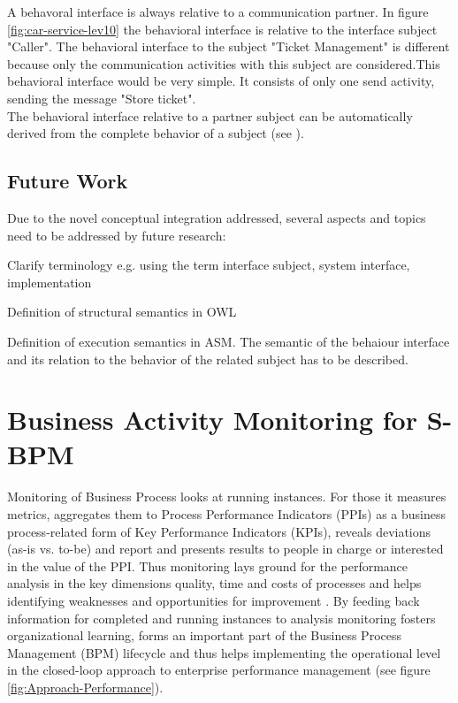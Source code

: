 A behavoral interface is always relative to a communication partner. In figure \ref{fig:car-service-lev10} the behavioral interface is relative to the interface subject "Caller". The behavioral interface to the subject "Ticket Management" is different because only the communication activities with this subject are considered.This behavioral interface would be very simple. It consists of only one send activity, sending the message "Store ticket".\\
The behavioral interface relative to a partner subject can be automatically derived from the complete behavior of a subject
(see \cite{article:jCPEX}).

\subsection{Future Work}

Due to the novel conceptual integration addressed, several aspects and topics need to be addressed by future research:
\begin{list}{-}{spacing}
	\item Clarify terminology e.g. using the term interface subject, system interface, implementation
	\item Definition of structural semantics in OWL
	\item Definition of execution semantics in ASM. The semantic of the behaiour interface and its relation to the behavior of the related subject has to be described.
\end{list}


\section{Business Activity Monitoring for S-BPM}\label{sec:BAMinSubjectOrientation}

Monitoring of Business Process looks at running instances. For those it measures metrics, aggregates them to Process Performance Indicators (PPIs) as a business process-related form of Key Performance Indicators (KPIs), reveals deviations (as-is vs. to-be) and report and presents results to people in charge or interested in the value of the PPI. Thus monitoring lays ground for the performance analysis in the key dimensions quality, time and costs of processes and helps identifying weaknesses and opportunities for improvement \cite{book:UntPerform}.
By feeding back information for completed and running instances to analysis monitoring fosters organizational learning, forms an important part of the Business Process Management (BPM) lifecycle \cite{article:SUbjetorientiertBPM} and thus helps implementing the operational level in the closed-loop approach to enterprise performance management \cite{book:processmonitoring} (see figure \ref{fig:Approach-Performance}).
\\



